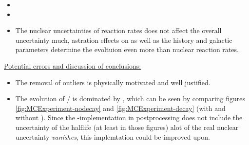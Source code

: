\begin{itemize}
\item {}
  \item {}
  \item The nuclear uncertainties of reaction rates does not affect the overall uncertainty much, astration effects on  as well as the history and galactic parameters determine the evoltuion even more than nuclear reaction rates.
\end{itemize}

\underline{Potential errors and discussion of conclusions:}
\begin{itemize}
\item The removal of outliers is physically motivated and well justified.
\item The evolution of / is dominated by \betadecay, which can be seen by comparing figures \ref{fig:MCExperiment-nodecay} and \ref{fig:MCExperiment-decay} (with and without \betadecay). Since the \betadecay-implementation in postprocessing does not include the uncertainty of the  halflife (at least in those figures) alot of the real nuclear uncertainty \textit{vanishes}, this implemtation could be improved upon.
\end{itemize}

